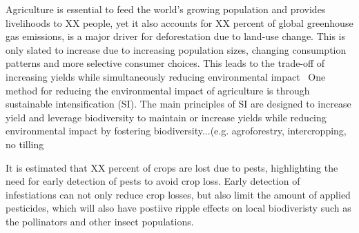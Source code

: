 Agriculture is essential to feed the world's growing  population and provides livelihoods to XX people, yet it also accounts for XX percent of global greenhouse gas emissions, is a major driver for deforestation due to land-use change. This is only slated to increase due to increasing population sizes, changing consumption patterns and more selective consumer choices. This leads to the trade-off of increasing yields while simultaneously reducing environmental  impact~\cite{McGreevy2022} %
One method for reducing the environmental impact of agriculture is through sustainable intensification (SI). The main principles of SI are designed to increase yield and leverage biodiversity to maintain or increase yields while reducing environmental impact by fostering biodiversity...(e.g. agroforestry, intercropping, no tilling

It is estimated that XX percent of crops are  lost due to pests, highlighting the need for early detection of pests to avoid crop loss. Early detection of infestiations can not only reduce crop losses, but also limit the amount of applied pesticides, which will also have postiive ripple effects on local biodiveristy such as the pollinators and other insect populations. 

